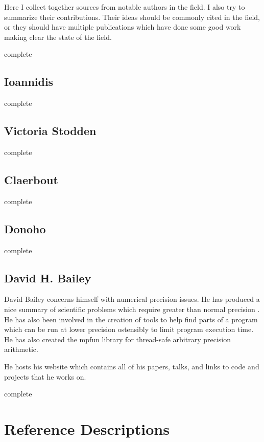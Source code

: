 \documentclass{article}
\newcommand{\complete}{
	\gls{complete}
}
\begin{document}
Here I collect together sources from notable authors in the field. I also try to summarize their contributions. Their ideas should be commonly cited in the field, or they should have multiple publications which have done some good work making clear the state of the field.

\complete

\subsection{Ioannidis}

\complete

\subsection{Victoria Stodden}

\complete

\subsection{Claerbout}

\complete

\subsection{Donoho}

\complete

\subsection{David H. Bailey}

David Bailey concerns himself with numerical precision issues. He has produced a nice summary of scientific problems which require greater than normal precision \cite{high-precision-arith-in-science,dhb-zurich-hp}. He has also been involved in the creation of tools to help find parts of a program which can be run at lower precision ostensibly to limit program execution time\cite{blame-analysis}. He has also created the mpfun library for thread-safe arbitrary precision arithmetic\cite{mpfun}.

He hosts his website\cite{david-bailey-site} which contains all of his papers, talks, and links to code and projects that he works on.

\complete

\section{Reference Descriptions}
\end{document}
